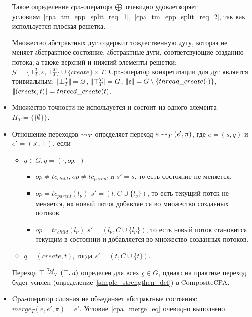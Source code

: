 \begin{itemize}
Такое определение cpa-оператора $\mathrel{\bigoplus}$ очевидно удовлетворяет условиям~\ref{cpa_tm_epp_split_req_1},~\ref{cpa_tm_epp_split_req_2}, так как используется плоская решетка.

Множество абстрактных дуг содержит тождественную дугу, которая не меняет абстрактное состояние, абстрактные дуги, соответсвующие созданию потока, а также верхний и нижний элементы решетки: $\mathcal{G} = \{\bot^T_T, \varepsilon, \top^T_T\} \cup \{create\} \times T$.
Cpa-оператор конкретизации для дуг является тривиальным: $\lvert \! \lvert \bot^T_T \rvert \! \rvert = \varnothing$,  $\lvert \! \lvert \top^T_T \rvert \! \rvert = G $, $\lvert \! \lvert \upvarepsilon \rvert \! \rvert =G \setminus \{thread\_create(\cdot)\}$, $\lvert \! \lvert (create,t) \rvert \! \rvert = thread\_create(t)$.

\item Множество точности не используется и состоит из одного элемента: $\Pi_T = \{\{\emptyset\}\}$.

\item Отношение переходов $\leadsto_T$ определяет переход $e \leadsto_T (e', \uppi)$, где $e=(s,q)$ и $e' = (s', \top)$, если 
\begin{itemize}
\item $q \in G, q =(\cdot, op, \cdot)$
\begin{itemize}
\item $op \neq tc_{child}$, $op \neq tc_{parent}$ и $s' = s$, то есть состояние не меняется.
\item $op = tc_{parent}(l_\nu)$ $s' = (t, C \cup \{l_\nu\})$, то есть текущий поток не меняется, но новый поток добавляется во множество созданных потоков.
\item $op = tc_{child}(l_\nu)$ $s' = (l_\nu, C \cup \{l_\nu\})$, то есть новый поток становится текущим в состоянии и добавляется во множество созданных потоков.
\end{itemize}
\item $q=(create, t)$, тогда $s' = (t,  C \cup \{t\})$.
\end{itemize}

Переход $\top \stackrel{\uptau, g}{\leadsto}_T (\top, \uppi)$ определен для всех $g\in G$, однако на практике переход будет усилен (определение~\ref{simple_strengthen_def}) в CompositeCPA.

\item Cpa-оператор слияния не объединяет абстрактные состояния: $merge_T(e, e', \pi) = e'$. Условие~\ref{cpa_merge_eq} очевидно выполнено.


\end{itemize}
